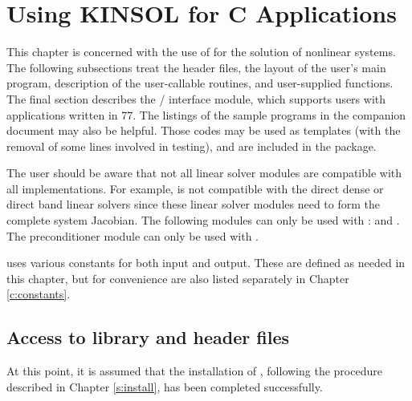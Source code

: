 \chapter{Using KINSOL for C Applications}\label{c:usage}

This chapter is concerned with the use of {\kinsol} for the solution
of nonlinear systems. The following subsections treat the header
files, the layout of the user's main program, description of the
{\kinsol} user-callable routines, and user-supplied functions.
The final section describes the {\F}/{\C} interface module, which supports
users with applications written in {\F}77. The listings of the sample
programs in the companion document \cite{kinsol2.4.0_ex} may also be helpful.
Those codes may be used as templates (with the removal of some lines involved
in testing), and are included in the {\kinsol} package.

The user should be aware that not all linear solver modules are compatible 
with all {\nvector} implementations. 
For example, {\nvecp} is not compatible with the direct dense or direct band 
linear solvers since these linear solver modules need to form the complete
system Jacobian. The following {\kinsol} modules can only be used with {\nvecs}:
{\kindense} and {\kinband}. The preconditioner module {\kinbbdpre}
can only be used with {\nvecp}.

{\kinsol} uses various constants for both input and output. These are
defined as needed in this chapter, but for convenience are also listed
separately in Chapter \ref{c:constants}.

\section{Access to library and header files}\label{ss:file_access}

At this point, it is assumed that the installation of {\kinsol},
following the procedure described in Chapter \ref{s:install}, has
been completed successfully.

